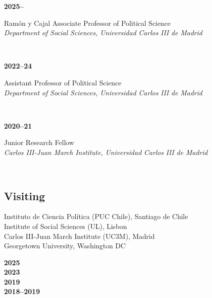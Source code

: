 \documentclass[a4paper, 12pt]{article}
\begin{document}
\begin{minipage}[t]{0.12\textwidth}
\textbf{2025--}
\end{minipage}\hfill\begin{minipage}[t]{0.88\textwidth}
Ramón y Cajal Associate Professor of Political Science\\
\textit{Department of Social Sciences, Universidad Carlos III de Madrid}\\\vspace{-8pt}
\end{minipage}\\
\begin{minipage}[t]{0.12\textwidth}
\textbf{2022--24}
\end{minipage}\hfill\begin{minipage}[t]{0.88\textwidth}
Assistant Professor of Political Science\\
\textit{Department of Social Sciences, Universidad Carlos III de Madrid}\\\vspace{-8pt}
\end{minipage}\\
\begin{minipage}[t]{0.12\textwidth}
\textbf{2020--21}
\end{minipage}\hfill\begin{minipage}[t]{0.88\textwidth}
Junior Research Fellow\\
\textit{Carlos III-Juan March Institute, Universidad Carlos III de Madrid}\\\vspace{-8pt}
\end{minipage}\\

\vspace{-10pt}
\subsection*{Visiting}

\begin{minipage}[t]{0.82\textwidth}
	Instituto de Ciencia Política (PUC Chile), Santiago de Chile\vspace{2pt}\\
  Institute of Social Sciences (UL), Lisbon\vspace{2pt}\\
  Carlos III-Juan March Institute (UC3M), Madrid\vspace{2pt}\\
	Georgetown University, Washington DC
\end{minipage}
\begin{minipage}[t]{0.18\textwidth}
  \flushright
	\textbf{2025}\\\vspace{7pt}
	\textbf{2023}\\\vspace{7pt}
  \textbf{2019}\\\vspace{7pt}
	\textbf{2018--2019}
\end{minipage}
\end{document}
